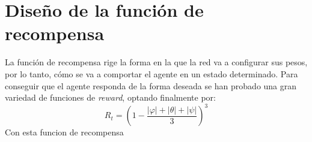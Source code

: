 
\section{Diseño de la función de recompensa}
La función de recompensa rige la forma en la que la red va a configurar sus pesos, por lo tanto, cómo se va a comportar el agente en un estado determinado.
Para conseguir que el agente responda de la forma deseada se han probado una gran variedad de funciones de \textit{reward}, optando finalmente por:
\begin{equation}
	R_t = \left( 1-\frac{|\varphi|  + |\theta| + |\psi|}{3}\right)^3
\end{equation}
Con esta funcion de recompensa 

